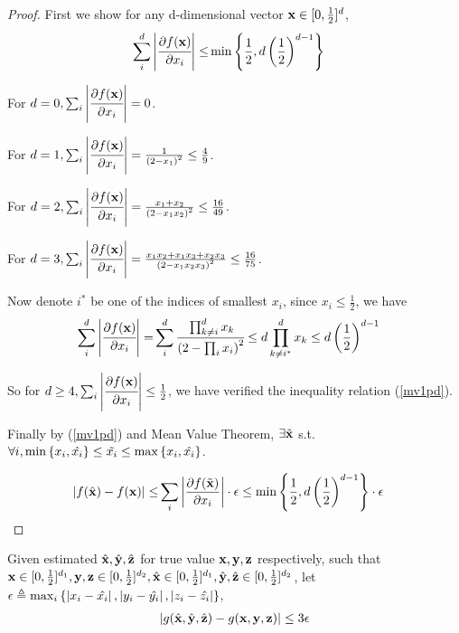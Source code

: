 	\begin{proof}
        First we show for any d-dimensional vector ${\bf x} \in [0, \frac{1}{2}]^d$,
        \begin{align}
			\label{mv1pd}
			\sum_i^d \left\vert\cfrac{\partial f({\bf x})}{\partial x_i}\right\vert \leq & \min{\left\{\frac{1}{2}, d \left( \frac{1}{2} \right)^{d-1}\right\}}
		\end{align}

    	For $d=0, \sum_i\left\vert \cfrac{\partial f({\bf x})}{\partial x_i}\right\vert = 0$.

    	For $d=1, \sum_i\left\vert \cfrac{\partial f({\bf x})}{\partial x_i}\right\vert = \frac{1}{\left( 2 - x_1 \right)^2} \leq \frac{4}{9} $.

    	For $d=2, \sum_i\left\vert \cfrac{\partial f({\bf x})}{\partial x_i}\right\vert = \frac{x_1 + x_2}{\left( 2 - x_1x_2 \right)^2} \leq \frac{16}{49} $.

    	For $d=3, \sum_i\left\vert \cfrac{\partial f({\bf x})}{\partial x_i}\right\vert = \frac{x_1 x_2 + x_1 x_3 + x_2 x_3}{\left( 2 - x_1x_2x_3 \right)^2} \leq \frac{16}{75} $.

		Now denote $i^*$ be one of the indices of smallest $x_i$, since $x_i \leq \frac{1}{2}$, we have
    	\begin{align*}
    		\sum_i^d \left\vert\cfrac{\partial f({\bf x})}{\partial x_i}\right\vert  =& \sum_i^d \cfrac{ \prod_{k \neq i}^d x_k  }{\left( 2 - \prod_i x_i \right)^2}
    		\leq  d \prod_{k \neq i^*}^d x_k
    		\leq  d \left( \frac{1}{2} \right)^{d-1}
    	\end{align*}

		So for $d \geq 4, \sum_i \left\vert\cfrac{\partial f({\bf x})}{\partial x_i}\right\vert \leq \frac{1}{2}$, we have verified the inequality relation (\ref{mv1pd}).

		Finally by (\ref{mv1pd}) and Mean Value Theorem, $\exists \tilde{\bf x}$ s.t. $\forall i, \min\left\{x_i,\hat{x_i}\right\} \leq \tilde{x_i} \leq \max\left\{x_i, \hat{x_i}\right\}$.

		\begin{align*}
			\left\vert f(\hat{\bf x}) - f({\bf x})\right\vert \leq& \sum_i\left\vert \frac{\partial f(\tilde{\bf x})}{\partial x_i}\right\vert \cdot \epsilon
		\leq  \min{\left\{\frac{1}{2}, d \left( \frac{1}{2} \right)^{d-1}\right\}} \cdot \epsilon
		\end{align*}
	\end{proof}

	\begin{Lem}
		\label{meanvalue2}
		Given estimated $\hat{\bf x},\hat{\bf y},\hat{\bf z}$ for true value $ {\bf x}, {\bf y}, {\bf z}$ respectively, such that ${\bf x} \in [0, \frac{1}{2}]^{d_1} , {\bf y,z} \in [0, \frac{1}{2}]^{d_2}, \hat{\bf x} \in [0, \frac{1}{2}]^{d_1} , \hat{\bf y},\hat{\bf z} \in [0, \frac{1}{2}]^{d_2}$,
		let $\epsilon \triangleq \max_i \left\{\left\vert x_i - \hat{x_i}\right\vert, \left\vert y_i - \hat{y_i} \right\vert , \left\vert z_i - \hat{z_i}\right\vert\right\}$,
		\begin{align*}
		\left\vert g(\hat{\bf x}, \hat{\bf y}, \hat{\bf z}) - g({\bf x,y,z})\right\vert
		\leq  3\epsilon
		\end{align*}

	\end{Lem}

